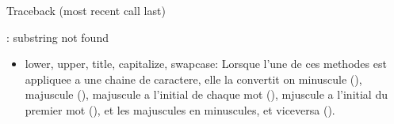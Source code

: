 \documentclass[letterpaper,10pt,french]{sphinxmanual}
\begin{document}
\begin{sphinxVerbatim}[commandchars=\\\{\}]
Traceback (most recent call last)
\PYGZbs{}\PYGZbs{}\PYGZbs{}\PYGZbs{}\PYGZbs{}  
 
 
 

: substring not found
\end{sphinxVerbatim}
\begin{itemize}
\item {} 
\sphinxAtStartPar
lower, upper, title, capitalize, swapcase: Lorsque l’une de ces methodes est appliquee a une chaine de caractere, elle la convertit on minuscule (), majuscule (), majuscule a l’initial de chaque mot (), mjuscule a l’initial du premier mot (), et les majuscules en minuscules, et vice\sphinxhyphen{}versa ().

\end{itemize}
\end{document}
